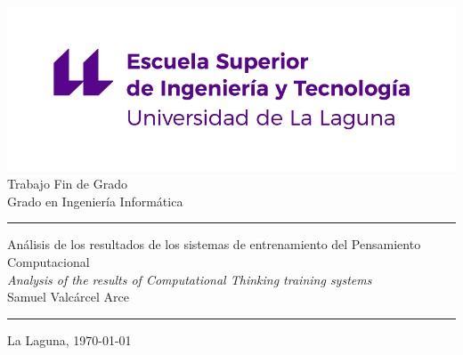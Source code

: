\documentclass[spanish,a4paper,14pt,oneside]{extreport}
\begin{document}
   
   
  \pagestyle{empty}
  \thispagestyle{empty}
   
   
  \newcommand{\HRule}{\rule{\linewidth}{1mm}}
  \setlength{\parindent}{0mm}
  \setlength{\parskip}{2.5mm}
   
   
  \begin{center}
  \includegraphics[scale=0.8]{images/logo_nuevo}\\[10mm]
  {\Huge Trabajo Fin de Grado}\\
  \bigskip
  {\LARGE Grado en Ingeniería Informática}\\
  \end{center}
   
  \HRule
  \begin{flushright}
         {\Huge Análisis de los resultados de los sistemas de entrenamiento del Pensamiento Computacional} \\[0.35mm]
         {\Large \textit{Analysis of the results of Computational Thinking training systems}} \\[5mm]
         {\Large Samuel Valcárcel Arce} \\[5mm]
  \end{flushright}
  \HRule
  \begin{center}
   \Large La Laguna, \today
  \end{center}
   
  \setlength{\parindent}{5mm}
   
  \newpage
  \thispagestyle{empty}
   
\end{document}
